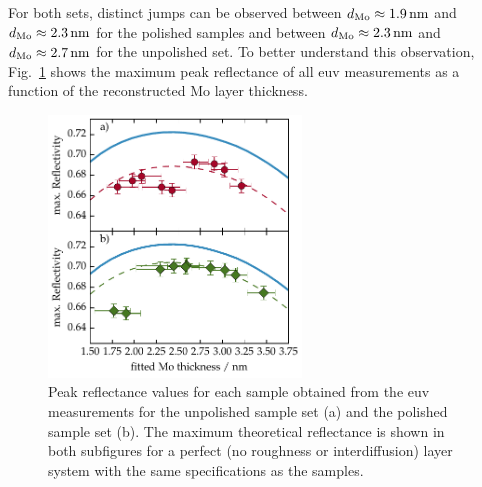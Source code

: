For both sets, distinct jumps can be observed between $d_\text{Mo}\approx\nm{1.9}$ and $d_\text{Mo}\approx\nm{2.3}$ for the polished samples and between $d_\text{Mo}\approx\nm{2.3}$ and $d_\text{Mo}\approx\nm{2.7}$ for the unpolished set. To better understand this observation, Fig.~\ref{ch_spec:fig_EUV_peak_refl} shows the maximum peak reflectance of all \gls{euv} measurements as a function of the reconstructed Mo layer thickness.
\begin{figure}[htbp]
\centering
\includegraphics[width=0.6\textwidth]{img/MoSi_EUV_peak}
\caption[Peak reflectance values for each Mo/Si/C sample in comparison with theoretical expectation.]{Peak reflectance values for each sample obtained from the \gls{euv} measurements for the unpolished sample set (a) and the polished sample set (b). The maximum theoretical reflectance is shown in both subfigures for a perfect (no roughness or interdiffusion) layer system with the same specifications as the samples.}
\label{ch_spec:fig_EUV_peak_refl}
\end{figure}
